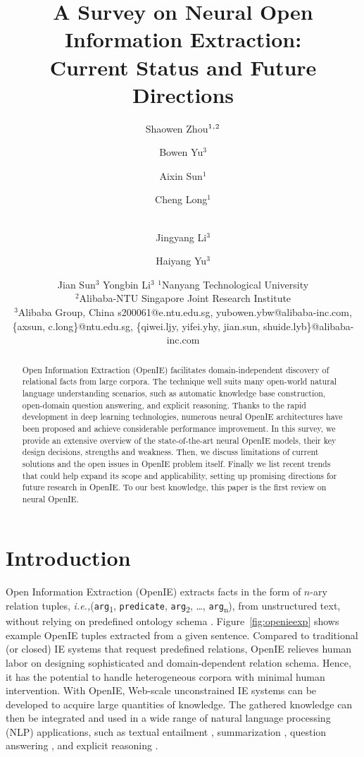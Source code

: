 \documentclass{article}
\title{A Survey on Neural Open Information Extraction:\\ Current Status and Future Directions}
\author{
Shaowen Zhou$^1\textsuperscript{,}^2$
\and
Bowen Yu$^3$\and
Aixin Sun$^1$\and
Cheng Long$^1$\and\\
Jingyang Li$^3$\and
Haiyang Yu$^3$\and
Jian Sun$^3$\And
Yongbin Li$^3$
\affiliations
$^1$Nanyang Technological University\\
$^2$Alibaba-NTU Singapore Joint Research Institute\\
$^3$Alibaba Group, China
\emails
s200061@e.ntu.edu.sg,
yubowen.ybw@alibaba-inc.com,\\
\{axsun, c.long\}@ntu.edu.sg,
\{qiwei.ljy, yifei.yhy, jian.sun, shuide.lyb\}@alibaba-inc.com
}
\newcommand{\ie}{\emph{i.e.,}\xspace}
\begin{document}
\maketitle

\begin{abstract}
Open Information Extraction (OpenIE) facilitates domain-independent discovery of relational facts from large corpora. The technique well suits many open-world natural language understanding scenarios, such as automatic knowledge base construction, open-domain question answering, and explicit reasoning. 
Thanks to the rapid development in deep learning technologies, numerous neural OpenIE architectures have been proposed and achieve considerable performance improvement.
In this survey, we provide an extensive overview of the state-of-the-art neural OpenIE models,  their key design decisions, strengths and weakness. 
Then, we discuss limitations of current solutions and the open issues in OpenIE problem itself. Finally we list recent trends that could help expand its scope and applicability, setting up promising directions for future research in OpenIE. To our best knowledge, this paper is the first review on neural OpenIE.
\end{abstract}

\section{Introduction}
\label{sec:intro}
Open Information Extraction (OpenIE) extracts facts in the form of $n$-ary relation tuples, \ie (\verb|arg|\textsubscript{1}, \verb|predicate|, \verb|arg|\textsubscript{2}, \ldots, \verb|arg|\textsubscript{n}), from unstructured text, without relying on predefined ontology schema \cite{niklaus-etal-2018-survey}.
Figure~\ref{fig:openieexp} shows example OpenIE tuples extracted from a given sentence. 
Compared to traditional (or closed) IE systems that request predefined relations, OpenIE relieves human labor on designing sophisticated and domain-dependent relation schema. Hence, it has the potential to handle heterogeneous corpora with minimal human intervention. 
With OpenIE, Web-scale unconstrained IE systems can be developed to acquire large quantities of knowledge.
The gathered knowledge can then be integrated and used in a wide range of natural language processing (NLP) applications, such as textual entailment \cite{berant-etal-2011-global}, summarization \cite{stanovsky-etal-2015-open}, question answering \cite{fader2014open,Mausam2016openie4}, and explicit reasoning \cite{fu-etal-2019-collaborative}.
\end{document}
